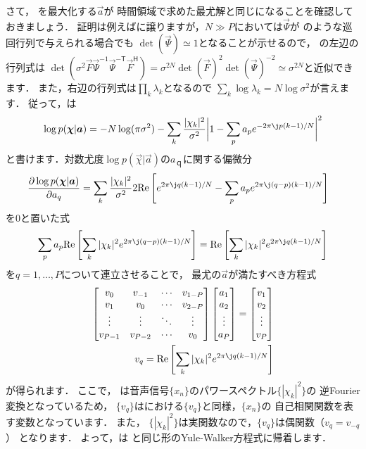 さて，
を最大化する$\Vec{a}$が
時間領域で求めた最尤解と同じになることを確認しておきましょう．
証明は例えば\cite{Sugiura2015}に譲りますが，$N \gg P$においては$\Vec{\Psi}$が
のような巡回行列で与えられる場合でも
$\det(\Vec{\Psi})\simeq 1$となることが示せるので，
の左辺の行列式は
$\det(\sigma^2 \Vec{F} \Vec{\Psi}^{-1}\Vec{\Psi}^{-\mathsf T} \Vec{F}^{\mathsf H}) = 
\sigma^{2N} \det(\Vec{F})^2 \det(\Vec{\Psi})^{-2}\simeq\sigma^{2N}$と近似できます．
また，右辺の行列式は$\prod_k \lambda_k$となるので
$\sum_k \log \lambda_k = N \log \sigma^2$が言えます．
従って，は
\begin{align}
\log p(\Vec{\chi}|\Vec{a}) = 
- N \log (\pi\sigma^2)
- \sum_k 
\frac{|\chi_k|^2 }{\sigma^2}
\bigg|1 - \sum_p a_p e^{ - 2\pi\j p(k-1)/N} \bigg|^2 
\end{align}
と書けます．対数尤度$\log p(\Vec{\chi}|\Vec{a})$の$a_ｑ$に関する偏微分
\begin{align}
\frac{\partial \log p(\Vec{\chi}|\Vec{a})}{\partial a_q}&=
\sum_k \frac{|\chi_k|^2 }{\sigma^2}
2{\rm Re}\left[
e^{ 2\pi\j q(k-1)/N} - \sum_p a_p e^{2\pi\j (q-p)(k-1)/N}
\right] 
\nonumber
\end{align}
を0と置いた式
\begin{align}
\sum_p a_p 
{\rm Re}\left[
\sum_k |\chi_k|^2
e^{2\pi\j (q-p)(k-1)/N}
\right]
=
{\rm Re}\left[
\sum_k |\chi_k|^2 e^{ 2\pi\j q(k-1)/N}
\right]
\nonumber
\end{align}
を$q = 1,\ldots,P$について連立させることで，
最尤の$\Vec{a}$が満たすべき方程式
\begin{align}
\begin{bmatrix}
v_{0} & v_{-1} & \cdots & v_{1-P}\\
v_{1} & v_{0} & \cdots & v_{2-P}\\
\vdots & \vdots & \ddots & \vdots\\
v_{P-1} & v_{P-2} & \cdots & v_{0}
\end{bmatrix}
\begin{bmatrix}
a_1\\
a_2\\
\vdots\\
a_P
\end{bmatrix}
=
\begin{bmatrix}
v_{1}\\
v_{2}\\
\vdots\\
v_{P}
\end{bmatrix}
\label{eq:lpc_YuleWalker3}
\\
v_{q}=
{\rm Re}\left[
\sum_k |\chi_k|^2 e^{ 2\pi\j q(k-1)/N}
\right]
\label{eq:v_q}
\end{align}
が得られます．
ここで，
は音声信号$\{x_n\}$のパワースペクトル$\{|\chi_k|^2\}$の
逆Fourier変換となっているため，
$\{v_q\}$はにおける$\{v_q\}$と同様，$\{x_n\}$の
自己相関関数を表す変数となっています．
また，
$\{|\chi_k|^2\}$は実関数なので，$\{v_q\}$は偶関数（$v_q = v_{-q}$）
となります．
よって，は
と同じ形のYule-Walker方程式に帰着します．






